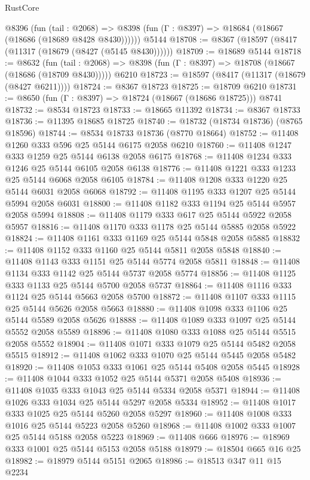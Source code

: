 \begin{lexlean}{RustCore}
\begin{coremodule}
    @8396
      (fun (tail : @2068) =>
      @8398 (fun (Γ : @8397) => @18684 (@18667 (@18686 (@18689 @8428 @8430))))))
    @5144
@18708 := @8367 (@18597 (@8417 (@11317 (@18679 (@8427 (@5145 @8430))))))
@18709 := @18689 @5144
@18718 := @8632
    (fun (tail : @2068) => @8398 (fun (Γ : @8397) => @18708 (@18667 (@18686 (@18709 @8430)))))
    @6210
@18723 := @18597 (@8417 (@11317 (@18679 (@8427 @6211))))
@18724 := @8367 @18723
@18725 := @18709 @6210
@18731 := @8650 (fun (Γ : @8397) => @18724 (@18667 (@18686 @18725))) @8741
@18732 := @8534 @18723
@18733 := @18665 @11392
@18734 := @8367 @18733
@18736 := @11395 @18685 @18725
@18740 := @18732 (@18734 @18736) (@8765 @18596)
@18744 := @8534 @18733 @18736 (@8770 @18664)
@18752 := @11408 @1260 @333 @596 @25 @5144 @6175 @2058 @6210
@18760 := @11408 @1247 @333 @1259 @25 @5144 @6138 @2058 @6175
@18768 := @11408 @1234 @333 @1246 @25 @5144 @6105 @2058 @6138
@18776 := @11408 @1221 @333 @1233 @25 @5144 @6068 @2058 @6105
@18784 := @11408 @1208 @333 @1220 @25 @5144 @6031 @2058 @6068
@18792 := @11408 @1195 @333 @1207 @25 @5144 @5994 @2058 @6031
@18800 := @11408 @1182 @333 @1194 @25 @5144 @5957 @2058 @5994
@18808 := @11408 @1179 @333 @617 @25 @5144 @5922 @2058 @5957
@18816 := @11408 @1170 @333 @1178 @25 @5144 @5885 @2058 @5922
@18824 := @11408 @1161 @333 @1169 @25 @5144 @5848 @2058 @5885
@18832 := @11408 @1152 @333 @1160 @25 @5144 @5811 @2058 @5848
@18840 := @11408 @1143 @333 @1151 @25 @5144 @5774 @2058 @5811
@18848 := @11408 @1134 @333 @1142 @25 @5144 @5737 @2058 @5774
@18856 := @11408 @1125 @333 @1133 @25 @5144 @5700 @2058 @5737
@18864 := @11408 @1116 @333 @1124 @25 @5144 @5663 @2058 @5700
@18872 := @11408 @1107 @333 @1115 @25 @5144 @5626 @2058 @5663
@18880 := @11408 @1098 @333 @1106 @25 @5144 @5589 @2058 @5626
@18888 := @11408 @1089 @333 @1097 @25 @5144 @5552 @2058 @5589
@18896 := @11408 @1080 @333 @1088 @25 @5144 @5515 @2058 @5552
@18904 := @11408 @1071 @333 @1079 @25 @5144 @5482 @2058 @5515
@18912 := @11408 @1062 @333 @1070 @25 @5144 @5445 @2058 @5482
@18920 := @11408 @1053 @333 @1061 @25 @5144 @5408 @2058 @5445
@18928 := @11408 @1044 @333 @1052 @25 @5144 @5371 @2058 @5408
@18936 := @11408 @1035 @333 @1043 @25 @5144 @5334 @2058 @5371
@18944 := @11408 @1026 @333 @1034 @25 @5144 @5297 @2058 @5334
@18952 := @11408 @1017 @333 @1025 @25 @5144 @5260 @2058 @5297
@18960 := @11408 @1008 @333 @1016 @25 @5144 @5223 @2058 @5260
@18968 := @11408 @1002 @333 @1007 @25 @5144 @5188 @2058 @5223
@18969 := @11408 @666
@18976 := @18969 @333 @1001 @25 @5144 @5153 @2058 @5188
@18979 := @18504 @665 @16 @25
@18982 := @18979 @5144 @5151 @2065
@18986 := @18513 @347 @11 @15 @2234

\end{coremodule}
\end{lexlean}
